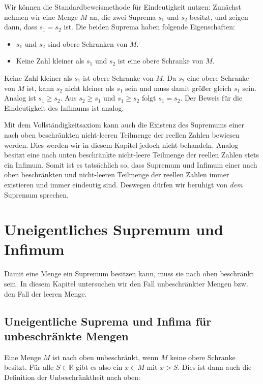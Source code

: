\documentclass[fontsize=9pt,
               parskip=half-,
               DIV=14,
               listof=chapterentry,
               tocflat]{scrbook}
\begin{document}
\begin{proof*}
Wir können die Standardbeweismethode für Eindeutigkeit nutzen: Zunächst nehmen wir eine Menge $M$ an, die zwei Suprema $s_{1}$ und $s_{2}$ besitzt, und zeigen dann, dass $s_{1}=s_{2}$ ist. Die beiden Suprema haben folgende Eigenschaften:

\begin{itemize}
\item $s_{1}$ und $s_{2}$ sind obere Schranken von $M$.
\item Keine Zahl kleiner als $s_{1}$ und $s_{2}$ ist eine obere Schranke von $M$.
\end{itemize}

Keine Zahl kleiner als $s_{1}$ ist obere Schranke von $M$. Da $s_{2}$ eine obere Schranke von $M$ ist, kann $s_{2}$ nicht kleiner als $s_{1}$ sein und muss damit größer gleich $s_{1}$ sein. Analog ist $s_{1}\geq s_{2}$. Aus $s_{2}\geq s_{1}$ und $s_{1}\geq s_{2}$ folgt $s_{1}=s_{2}$. Der Beweis für die Eindeutigkeit des Infimums ist analog.

\end{proof*}

Mit dem Vollständigkeitsaxiom kann auch die Existenz des Supremums einer nach oben beschränkten nicht-leeren Teilmenge der reellen Zahlen bewiesen werden. Dies werden wir in diesem Kapitel jedoch nicht behandeln. Analog besitzt eine nach unten beschränkte nicht-leere Teilmenge der reellen Zahlen stets ein Infimum. Somit ist es tatsächlich so, dass Supremum und Infimum einer nach oben beschränkten und nicht-leeren Teilmenge der reellen Zahlen immer existieren und immer eindeutig sind. Deswegen dürfen wir beruhigt von \emph{dem} Supremum sprechen.

\chapter{Uneigentliches Supremum und Infimum}

Damit eine Menge ein Supremum besitzen kann, muss sie nach oben beschränkt sein. In diesem Kapitel untersuchen wir den Fall unbeschränkter Mengen bzw. den Fall der leeren Menge.

\section{Uneigentliche Suprema und Infima für unbeschränkte Mengen}

Eine Menge $M$ ist nach oben unbeschränkt, wenn $M$ keine obere Schranke besitzt. Für alle $S\in \mathbb {R} $ gibt es also ein $x\in M$ mit $x>S$. Dies ist dann auch die Definition der Unbeschränktheit nach oben:
\end{document}
